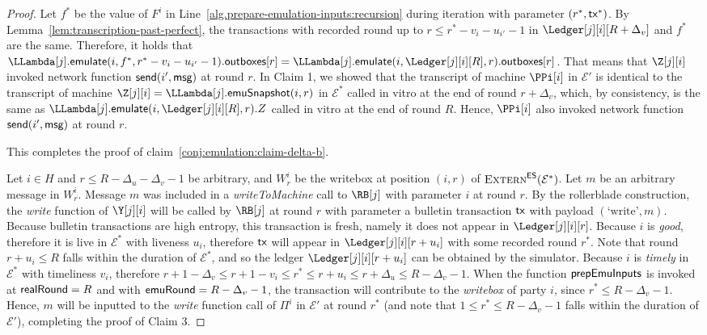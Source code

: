 \begin{proof}
  Let $f^*$ be the value of $F^i$ in Line~\ref{alg.prepare-emulation-inputs:recursion}
  during iteration with parameter $(r^*, \textsf{tx}^*)$.
  By Lemma~\ref{lem:transcription-past-perfect}, the transactions with
  recorded round up to $r \leq r^* - v_i - u_{i'} - 1$ in $\Ledger[j][i][R + \Delta_v]$
  and $f^*$ are the same. Therefore, it holds that
  $\LLambda[j].\emulate(i, f^*, r^* - v_i - u_{i'} - 1).\outboxes[r] = \LLambda[j].\emulate(i, \Ledger[j][i][R], r).\outboxes[r]$.
  That means that $\Z[j][i]$ invoked network function $\textsf{send}(i', \textsf{msg})$ at round $r$.
  In Claim 1, we showed that the transcript of machine $\PPi[i]$ in $\mathcal{E}'$
  is identical to the transcript of machine $\Z[j][i] = \LLambda[j].\emulationSnapshot(i,r)$ in $\mathcal{E}^*$
  called in vitro at the end of round $r + \Delta_v$, which, by consistency, is the same as
  $\LLambda[j].\emulate(i, \Ledger[j][i][R], r).Z$ called in vitro at the end of round $R$.
  Hence, $\PPi[i]$ also invoked network function $\textsf{send}(i', \textsf{msg})$ at round $r$.

  This completes the proof of claim~\ref{conj:emulation:claim-delta-b}.


  Let $i \in H$ and $r \leq R - \Delta_u - \Delta_v - 1$ be arbitrary, and $W^i_r$ be the writebox
  at position $(i, r)$ of $\textsc{Extern}^{\textsf{ES}}(\mathcal{E}^*)$. Let $m$ be an arbitrary message
  in $W^i_r$. Message $m$ was included in a \emph{writeToMachine} call to $\RB[j]$
  with parameter $i$ at round $r$. By the rollerblade construction, the \emph{write}
  function of $\Y[j][i]$ will be called by $\RB[j]$ at round $r$ with parameter a bulletin
  transaction $\textsf{tx}$ with payload $(\text{`write'}, m)$. Because bulletin transactions are high entropy,
  this transaction is fresh, namely it does not appear in $\Ledger[j][i][r]$.
  Because $i$ is \emph{good}, therefore it is live in $\mathcal{E}^*$ with liveness $u_i$,
  therefore $\textsf{tx}$ will appear in $\Ledger[j][i][r + u_i]$ with some recorded round $r^*$.
  Note that round $r + u_i \leq R$ falls within the duration of $\mathcal{E}^*$, and
  so the ledger $\Ledger[j][i][r + u_i]$ can be obtained by the simulator.
  Because $i$ is \emph{timely} in $\mathcal{E}^*$ with timeliness $v_i$, therefore
  $r + 1 - \Delta_v \leq r + 1 - v_i \leq r^* \leq r + u_i \leq r + \Delta_u \leq R - \Delta_v - 1$.
  When the function $\textsf{prepEmuInputs}$ is invoked at $\textsf{realRound} = R$
  and with $\textsf{emuRound} = R - \Delta_v - 1$, the transaction will contribute
  to the \emph{writebox} of party $i$, since $r^* \leq R - \Delta_v - 1$.
  Hence, $m$ will be inputted to the \emph{write} function call of $\Pi^i$
  in $\mathcal{E}'$ at round $r^*$ (and note that $1 \leq r^* \leq R - \Delta_v - 1$ falls
  within the duration of $\mathcal{E}'$), completing the proof of Claim 3.
  \Qed
\end{proof}

